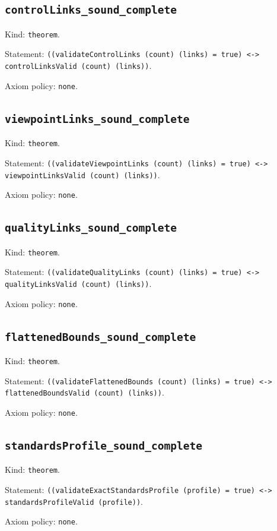 \documentclass[11pt]{article}
\begin{document}
\subsection*{\texttt{controlLinks\_sound\_complete}}
\noindent Kind: \texttt{theorem}.\par
\noindent Statement: \texttt{((validateControlLinks (count) (links) = true) <-> controlLinksValid (count) (links))}.\par
\noindent Axiom policy: \texttt{none}.\par
\subsection*{\texttt{viewpointLinks\_sound\_complete}}
\noindent Kind: \texttt{theorem}.\par
\noindent Statement: \texttt{((validateViewpointLinks (count) (links) = true) <-> viewpointLinksValid (count) (links))}.\par
\noindent Axiom policy: \texttt{none}.\par
\subsection*{\texttt{qualityLinks\_sound\_complete}}
\noindent Kind: \texttt{theorem}.\par
\noindent Statement: \texttt{((validateQualityLinks (count) (links) = true) <-> qualityLinksValid (count) (links))}.\par
\noindent Axiom policy: \texttt{none}.\par
\subsection*{\texttt{flattenedBounds\_sound\_complete}}
\noindent Kind: \texttt{theorem}.\par
\noindent Statement: \texttt{((validateFlattenedBounds (count) (links) = true) <-> flattenedBoundsValid (count) (links))}.\par
\noindent Axiom policy: \texttt{none}.\par
\subsection*{\texttt{standardsProfile\_sound\_complete}}
\noindent Kind: \texttt{theorem}.\par
\noindent Statement: \texttt{((validateExactStandardsProfile (profile) = true) <-> standardsProfileValid (profile))}.\par
\noindent Axiom policy: \texttt{none}.\par
\end{document}
